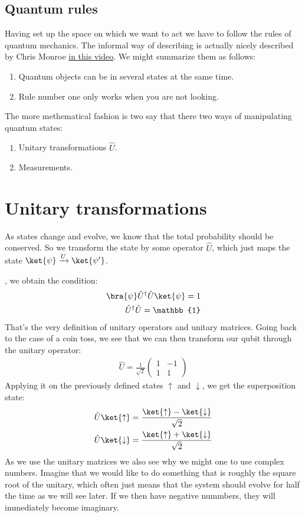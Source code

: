 \subsection{Quantum rules}
Having set up the space on which we want to act we have to follow the rules of quantum mechanics. The informal way of describing is actually nicely described by Chris Monroe \href{https://youtu.be/CC7nlBM2cSM}{in this video}. We might summarize them as follows:
\begin{enumerate}
\item Quantum objects can be in several states at the same time.
\item Rule number one only works when you are not looking.
\end{enumerate}

The more methematical fashion is two say that there two ways of manipulating quantum states:
\begin{enumerate}
\item Unitary transformations $\hat{U}$.
\item Measurements.
\end{enumerate}

\section{Unitary transformations}
As states change and evolve, we know that the total probability should be conserved. So we transform the state by some operator $\hat{U}$, which just maps the state $\ket{\psi}\xrightarrow[]{U}\ket{\psi'}$. 

, we obtain the condition:
\begin{align}
\bra{\psi}\hat{U}^\dag\hat{U} \ket{\psi} = 1\\
\hat{U}^\dag\hat{U}  = \mathbb{1}
\end{align}
That's the very definition of unitary operators and unitary matrices.
Going back to the case of a coin toss, we see that we can then transform our qubit through the unitary operator:
\begin{align}
\hat{U}=\frac{1}{\sqrt{2}}\left(\begin{array}{cc}
1 & -1\\
1 & 1
\end{array}\right)
\end{align}
Applying it on the previously defined states $\uparrow$ and $\downarrow$, we get the superposition state:
\begin{align}
\hat{U}\ket{\uparrow} &= \frac{\ket{\uparrow}-\ket{\downarrow}}{\sqrt{2}}\\
\hat{U}\ket{\downarrow} &= \frac{\ket{\uparrow}+\ket{\downarrow}}{\sqrt{2}}
\end{align}
As we use the unitary matrices we also see why we might one to use complex numbers. Imagine that we would like to do something that is roughly the square root of the unitary, which often just means that the system should evolve for half the time as we will see later. If we then have negative nummbers, they will immediately become imaginary.

